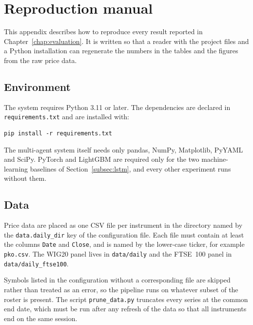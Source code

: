 \chapter{Reproduction manual}\label{app:reproduction}

This appendix describes how to reproduce every result reported in Chapter~\ref{chap:evaluation}. It is written so that a reader with the project files and a Python installation can regenerate the numbers in the tables and the figures from the raw price data.

\section{Environment}\label{app:environment}

The system requires Python 3.11 or later. The dependencies are declared in \texttt{requirements.txt} and are installed with:

\begin{verbatim}
pip install -r requirements.txt
\end{verbatim}

\noindent
The multi-agent system itself needs only pandas, NumPy, Matplotlib, PyYAML and SciPy. PyTorch and LightGBM are required only for the two machine-learning baselines of Section~\ref{subsec:lstm}, and every other experiment runs without them.

\section{Data}\label{app:data}

Price data are placed as one CSV file per instrument in the directory named by the \texttt{data.daily\_dir} key of the configuration file. Each file must contain at least the columns \texttt{Date} and \texttt{Close}, and is named by the lower-case ticker, for example \texttt{pko.csv}. The WIG20 panel lives in \texttt{data/daily} and the FTSE~100 panel in \texttt{data/daily\_ftse100}.

Symbols listed in the configuration without a corresponding file are skipped rather than treated as an error, so the pipeline runs on whatever subset of the roster is present. The script \texttt{prune\_data.py} truncates every series at the common end date, which must be run after any refresh of the data so that all instruments end on the same session.

